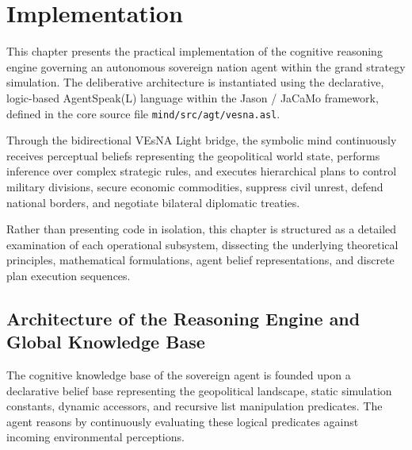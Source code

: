 
\chapter{Implementation}
\label{chap:implementation}

This chapter presents the practical implementation of the cognitive reasoning engine governing an autonomous sovereign nation agent within the grand strategy simulation. The deliberative architecture is instantiated using the declarative, logic-based AgentSpeak(L) language within the Jason / JaCaMo framework, defined in the core source file \texttt{mind/src/agt/vesna.asl}.

Through the bidirectional VEsNA Light bridge, the symbolic mind continuously receives perceptual beliefs representing the geopolitical world state, performs inference over complex strategic rules, and executes hierarchical plans to control military divisions, secure economic commodities, suppress civil unrest, defend national borders, and negotiate bilateral diplomatic treaties.

Rather than presenting code in isolation, this chapter is structured as a detailed examination of each operational subsystem, dissecting the underlying theoretical principles, mathematical formulations, agent belief representations, and discrete plan execution sequences.

\section{Architecture of the Reasoning Engine and Global Knowledge Base}
\label{sec:impl_knowledge_base}

The cognitive knowledge base of the sovereign agent is founded upon a declarative belief base representing the geopolitical landscape, static simulation constants, dynamic accessors, and recursive list manipulation predicates. The agent reasons by continuously evaluating these logical predicates against incoming environmental perceptions.

